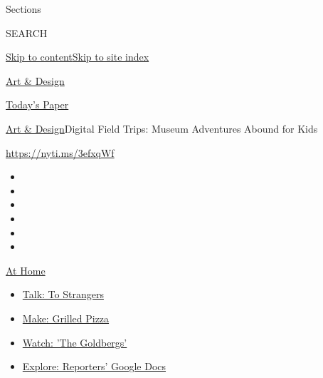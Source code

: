 Sections

SEARCH

\protect\hyperlink{site-content}{Skip to
content}\protect\hyperlink{site-index}{Skip to site index}

\href{https://www.nytimes3xbfgragh.onion/section/arts/design}{Art \&
Design}

\href{https://myaccount.nytimes3xbfgragh.onion/auth/login?response_type=cookie\&client_id=vi}{}

\href{https://www.nytimes3xbfgragh.onion/section/todayspaper}{Today's
Paper}

\href{/section/arts/design}{Art \& Design}\textbar{}Digital Field Trips:
Museum Adventures Abound for Kids

\href{https://nyti.ms/3efxqWf}{https://nyti.ms/3efxqWf}

\begin{itemize}
\item
\item
\item
\item
\item
\item
\end{itemize}

\href{https://www.nytimes3xbfgragh.onion/spotlight/at-home?action=click\&pgtype=Article\&state=default\&region=TOP_BANNER\&context=at_home_menu}{At
Home}

\begin{itemize}
\tightlist
\item
  \href{https://www.nytimes3xbfgragh.onion/2020/08/03/well/family/the-benefits-of-talking-to-strangers.html?action=click\&pgtype=Article\&state=default\&region=TOP_BANNER\&context=at_home_menu}{Talk:
  To Strangers}
\item
  \href{https://www.nytimes3xbfgragh.onion/2020/08/01/at-home/coronavirus-make-pizza-on-a-grill.html?action=click\&pgtype=Article\&state=default\&region=TOP_BANNER\&context=at_home_menu}{Make:
  Grilled Pizza}
\item
  \href{https://www.nytimes3xbfgragh.onion/2020/07/31/arts/television/goldbergs-abc-stream.html?action=click\&pgtype=Article\&state=default\&region=TOP_BANNER\&context=at_home_menu}{Watch:
  'The Goldbergs'}
\item
  \href{https://www.nytimes3xbfgragh.onion/interactive/2020/at-home/even-more-reporters-editors-diaries-lists-recommendations.html?action=click\&pgtype=Article\&state=default\&region=TOP_BANNER\&context=at_home_menu}{Explore:
  Reporters' Google Docs}
\end{itemize}

